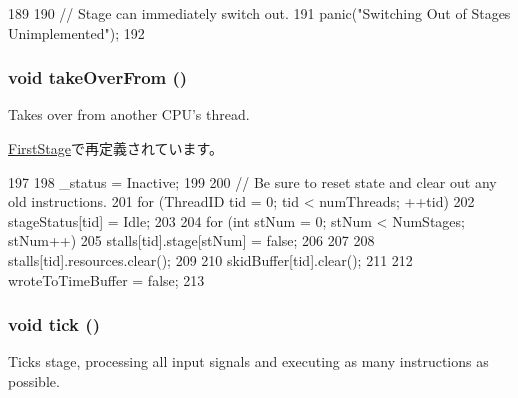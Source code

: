 \begin{DoxyCode}
189 {
190     // Stage can immediately switch out.
191     panic("Switching Out of Stages Unimplemented");
192 }
\end{DoxyCode}
\hypertarget{classPipelineStage_a8674059ce345e23aac5086b2c3e24a43}{
\subsubsection[{takeOverFrom}]{\setlength{\rightskip}{0pt plus 5cm}void takeOverFrom ()}}
\label{classPipelineStage_a8674059ce345e23aac5086b2c3e24a43}
Takes over from another CPU's thread. 

\hyperlink{classFirstStage_a8674059ce345e23aac5086b2c3e24a43}{FirstStage}で再定義されています。


\begin{DoxyCode}
197 {
198     _status = Inactive;
199 
200     // Be sure to reset state and clear out any old instructions.
201     for (ThreadID tid = 0; tid < numThreads; ++tid) {
202         stageStatus[tid] = Idle;
203 
204         for (int stNum = 0; stNum < NumStages; stNum++) {
205             stalls[tid].stage[stNum] = false;
206         }
207 
208         stalls[tid].resources.clear();
209 
210         skidBuffer[tid].clear();
211     }
212     wroteToTimeBuffer = false;
213 }
\end{DoxyCode}
\hypertarget{classPipelineStage_a873dd91783f9efb4a590aded1f70d6b0}{
\subsubsection[{tick}]{\setlength{\rightskip}{0pt plus 5cm}void tick ()}}
\label{classPipelineStage_a873dd91783f9efb4a590aded1f70d6b0}
Ticks stage, processing all input signals and executing as many instructions as possible. 


